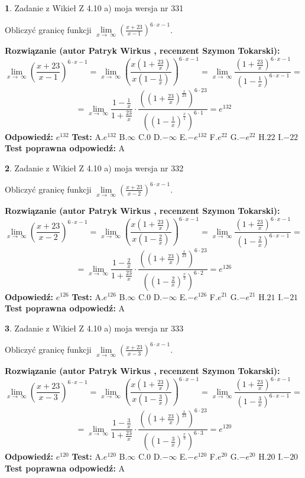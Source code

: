 \documentclass[12pt, a4paper]{article}
\theoremstyle{definition} %
\newtheorem{zad}{}
\newcommand{\zadStart}[1]{\begin{zad}#1\newline}
\newcommand{\zadStop}{\end{zad}}
\newcommand{\rozwStart}[2]{\noindent \textbf{Rozwiązanie (autor #1 , recenzent #2): }\newline}
\newcommand{\rozwStop}{\newline}
\newcommand{\odpStart}{\noindent \textbf{Odpowiedź:}\newline}
\newcommand{\odpStop}{\newline}
\newcommand{\testStart}{\noindent \textbf{Test:}\newline}
\newcommand{\testStop}{\newline}
\newcommand{\kluczStart}{\noindent \textbf{Test poprawna odpowiedź:}\newline}
\newcommand{\kluczStop}{\newline}
\begin{document}
\zadStart{Zadanie z Wikieł Z 4.10 a) moja wersja nr 331}

Obliczyć granicę funkcji  $\lim\limits_{x\to\ \infty}(\frac{x+23}{x-1})^{6\cdot x-1}$.
\zadStop
\rozwStart{Patryk Wirkus}{Szymon Tokarski}
$$\lim\limits_{x\to\ \infty}(\frac{x+23}{x-1})^{6\cdot x-1} = \lim\limits_{x\to\ \infty}(\frac{x(1+\frac{23}{x})}{x(1-\frac{1}{x})})^{6\cdot x-1}=\lim\limits_{x\to\ \infty}\frac{(1+\frac{23}{x})^{6\cdot x-1}}{(1-\frac{1}{x})^{6\cdot x-1}}=$$
$$=\lim\limits_{x\to\ \infty}\frac{1-\frac{1}{x}}{1+\frac{23}{x}}\cdot\frac{((1+\frac{23}{x})^{\frac{x}{23}})^{6\cdot23}}{((1-\frac{1}{x})^{\frac{x}{1}})^{6\cdot1}}=e^{132}$$
\rozwStop
\odpStart
$e^{132}$
\odpStop
\testStart
A.$e^{132}$ B.$\infty$ C.$0$ D.$-\infty$ E.$-e^{132}$
F.$e^{22}$ G.$-e^{22}$
H.$22$
I.$-22$
\testStop
\kluczStart
A
\kluczStop



\zadStart{Zadanie z Wikieł Z 4.10 a) moja wersja nr 332}

Obliczyć granicę funkcji  $\lim\limits_{x\to\ \infty}(\frac{x+23}{x-2})^{6\cdot x-1}$.
\zadStop
\rozwStart{Patryk Wirkus}{Szymon Tokarski}
$$\lim\limits_{x\to\ \infty}(\frac{x+23}{x-2})^{6\cdot x-1} = \lim\limits_{x\to\ \infty}(\frac{x(1+\frac{23}{x})}{x(1-\frac{2}{x})})^{6\cdot x-1}=\lim\limits_{x\to\ \infty}\frac{(1+\frac{23}{x})^{6\cdot x-1}}{(1-\frac{2}{x})^{6\cdot x-1}}=$$
$$=\lim\limits_{x\to\ \infty}\frac{1-\frac{2}{x}}{1+\frac{23}{x}}\cdot\frac{((1+\frac{23}{x})^{\frac{x}{23}})^{6\cdot23}}{((1-\frac{2}{x})^{\frac{x}{2}})^{6\cdot2}}=e^{126}$$
\rozwStop
\odpStart
$e^{126}$
\odpStop
\testStart
A.$e^{126}$ B.$\infty$ C.$0$ D.$-\infty$ E.$-e^{126}$
F.$e^{21}$ G.$-e^{21}$
H.$21$
I.$-21$
\testStop
\kluczStart
A
\kluczStop



\zadStart{Zadanie z Wikieł Z 4.10 a) moja wersja nr 333}

Obliczyć granicę funkcji  $\lim\limits_{x\to\ \infty}(\frac{x+23}{x-3})^{6\cdot x-1}$.
\zadStop
\rozwStart{Patryk Wirkus}{Szymon Tokarski}
$$\lim\limits_{x\to\ \infty}(\frac{x+23}{x-3})^{6\cdot x-1} = \lim\limits_{x\to\ \infty}(\frac{x(1+\frac{23}{x})}{x(1-\frac{3}{x})})^{6\cdot x-1}=\lim\limits_{x\to\ \infty}\frac{(1+\frac{23}{x})^{6\cdot x-1}}{(1-\frac{3}{x})^{6\cdot x-1}}=$$
$$=\lim\limits_{x\to\ \infty}\frac{1-\frac{3}{x}}{1+\frac{23}{x}}\cdot\frac{((1+\frac{23}{x})^{\frac{x}{23}})^{6\cdot23}}{((1-\frac{3}{x})^{\frac{x}{3}})^{6\cdot3}}=e^{120}$$
\rozwStop
\odpStart
$e^{120}$
\odpStop
\testStart
A.$e^{120}$ B.$\infty$ C.$0$ D.$-\infty$ E.$-e^{120}$
F.$e^{20}$ G.$-e^{20}$
H.$20$
I.$-20$
\testStop
\kluczStart
A
\kluczStop
\end{document}
